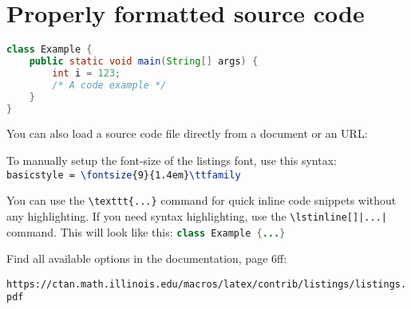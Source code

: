 \documentclass{article}
\begin{document}
\section*{Properly formatted source code}


\begin{lstlisting}[language = java]
class Example {
    public static void main(String[] args) {
        int i = 123;
        /* A code example */
    }
}
\end{lstlisting}

\bigskip

\noindent You can also load a source code file directly from a document or an
URL:

\bigskip




\bigskip

\noindent To manually setup the font-size of the listings font, use this syntax: \\
\lstinline[language = TeX]|basicstyle = \fontsize{9}{1.4em}\ttfamily|

\bigskip

\noindent You can use the \texttt{\textbackslash texttt\{...\}} command for
quick inline code snippets without any highlighting. If you need syntax
highlighting, use the \texttt{\textbackslash lstinline[]|...|} command. This
will look like this: \lstinline[language = Java]|class Example {...}|

\bigskip

\noindent Find all available options in the documentation, page 6ff:

\smallskip

\noindent\small\texttt
{https://ctan.math.illinois.edu/macros/latex/contrib/listings/listings.pdf}
\end{document}

